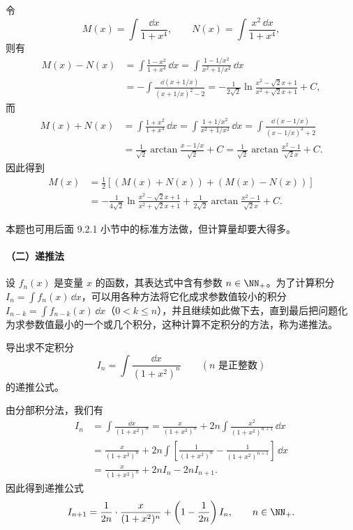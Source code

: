 \begin{xsolution}
令
\[
  M(x)=\int\frac{\dd x}{1+x^4},
  \qquad
  N(x)=\int\frac{x^2\,\dd x}{1+x^4},
\]
则有
\begin{align*}
  M(x)-N(x)
  &=\int\frac{1-x^2}{1+x^4}\,\dd x
   =\int\frac{1-1/x^2}{x^2+1/x^2}\,\dd x\\
  &=-\int\frac{\dd(x+1/x)}{(x+1/x)^2-2}
   =-\frac1{2\sqrt2}\ln\frac{x^2-\sqrt2x+1}{x^2+\sqrt2x+1}+C,
\end{align*}
而
\begin{align*}
  M(x)+N(x)
  &=\int\frac{1+x^2}{1+x^4}\,\dd x
   =\int\frac{1+1/x^2}{x^2+1/x^2}\,\dd x
   =\int\frac{\dd(x-1/x)}{(x-1/x)^2+2}\\
  &=\frac1{\sqrt2}\arctan\frac{x-1/x}{\sqrt2}+C
   =\frac1{\sqrt2}\arctan\frac{x^2-1}{\sqrt2x}+C.
\end{align*}
因此得到
\begin{align*}
  M(x)
  &=\frac12[(M(x)+N(x))+(M(x)-N(x))]\\
  &=-\frac1{4\sqrt2}\ln\frac{x^2-\sqrt2x+1}{x^2+\sqrt2x+1}
    +\frac1{2\sqrt2}\arctan\frac{x^2-1}{\sqrt2x}+C.
\end{align*}
\end{xsolution}

\begin{xremark}
本题也可用后面 9.2.1 小节中的标准方法做，但计算量却要大得多。
\end{xremark}

\paragraph{（二）递推法}

设 $f_n(x)$ 是变量 $x$ 的函数，其表达式中含有参数 $n\in\NN_+$。为了计算积分 $I_n=\int f_n(x)\,\dd x$，可以用各种方法将它化成求参数值较小的积分 $I_{n-k}=\int f_{n-k}(x)\,\dd x$（$0<k\le n$），并且继续如此做下去，直到最后把问题化为求参数值最小的一个或几个积分，这种计算不定积分的方法，称为递推法。

\begin{xexample}[9.1.9]
导出求不定积分
\[
  I_n=\int\frac{\dd x}{(1+x^2)^n}
  \qquad(n\text{ 是正整数})
\]
的递推公式。
\end{xexample}

\begin{xsolution}
由分部积分法，我们有
\begin{align*}
  I_n
  &=\int\frac{\dd x}{(1+x^2)^n}
   =\frac{x}{(1+x^2)^n}+2n\int\frac{x^2}{(1+x^2)^{n+1}}\,\dd x\\
  &=\frac{x}{(1+x^2)^n}+2n\int\left[\frac1{(1+x^2)^n}-\frac1{(1+x^2)^{n+1}}\right]\,\dd x\\
  &=\frac{x}{(1+x^2)^n}+2nI_n-2nI_{n+1}.
\end{align*}
因此得到递推公式
\[
  I_{n+1}=\frac1{2n}\cdot\frac{x}{(1+x^2)^n}
    +\left(1-\frac1{2n}\right)I_n,
  \qquad n\in\NN_+.
\]
\end{xsolution}

